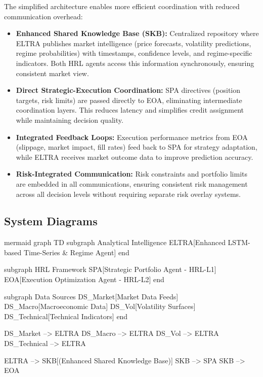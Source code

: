 \documentclass[11pt,a4paper]{article}
\begin{document}
The simplified architecture enables more efficient coordination with reduced communication overhead:

\begin{itemize}
\item   \textbf{Enhanced Shared Knowledge Base (SKB):} Centralized repository where ELTRA publishes market intelligence (price forecasts, volatility predictions, regime probabilities) with timestamps, confidence levels, and regime-specific indicators. Both HRL agents access this information synchronously, ensuring consistent market view.
\item   \textbf{Direct Strategic-Execution Coordination:} SPA directives (position targets, risk limits) are passed directly to EOA, eliminating intermediate coordination layers. This reduces latency and simplifies credit assignment while maintaining decision quality.
\item   \textbf{Integrated Feedback Loops:} Execution performance metrics from EOA (slippage, market impact, fill rates) feed back to SPA for strategy adaptation, while ELTRA receives market outcome data to improve prediction accuracy.
\item   \textbf{Risk-Integrated Communication:} Risk constraints and portfolio limits are embedded in all communications, ensuring consistent risk management across all decision levels without requiring separate risk overlay systems.

\end{itemize}
\subsection{System Diagrams}

mermaid
graph TD
    subgraph Analytical Intelligence
        ELTRA[Enhanced LSTM-based Time-Series \& Regime Agent]
    end

    subgraph HRL Framework
        SPA[Strategic Portfolio Agent - HRL-L1]
        EOA[Execution Optimization Agent - HRL-L2]
    end

    subgraph Data Sources
        DS\_Market[Market Data Feeds]
        DS\_Macro[Macroeconomic Data]
        DS\_Vol[Volatility Surfaces]
        DS\_Technical[Technical Indicators]
    end

    DS\_Market --> ELTRA
    DS\_Macro --> ELTRA
    DS\_Vol --> ELTRA
    DS\_Technical --> ELTRA

    ELTRA --> SKB[(Enhanced Shared Knowledge Base)]
    SKB --> SPA
    SKB --> EOA
    
\end{document}
